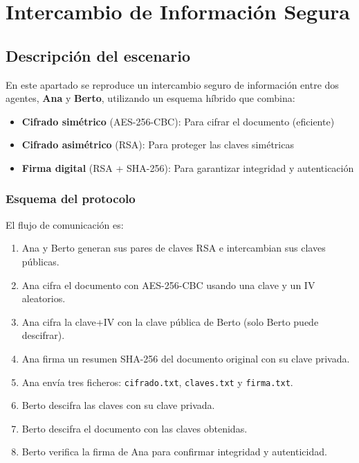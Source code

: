 \chapter{Intercambio de Información Segura}


\section{Descripción del escenario}

En este apartado se reproduce un intercambio seguro de información entre dos agentes, \textbf{Ana} y \textbf{Berto}, utilizando un esquema híbrido que combina:

\begin{itemize}[label=\textbullet]
    \item \textbf{Cifrado simétrico} (AES-256-CBC): Para cifrar el documento (eficiente)
    \item \textbf{Cifrado asimétrico} (RSA): Para proteger las claves simétricas
    \item \textbf{Firma digital} (RSA + SHA-256): Para garantizar integridad y autenticación
\end{itemize}

\subsection{Esquema del protocolo}

El flujo de comunicación es:

\begin{enumerate}
    \item Ana y Berto generan sus pares de claves RSA e intercambian sus claves públicas.
    \item Ana cifra el documento con AES-256-CBC usando una clave y un IV aleatorios.
    \item Ana cifra la clave+IV con la clave pública de Berto (solo Berto puede descifrar).
    \item Ana firma un resumen SHA-256 del documento original con su clave privada.
    \item Ana envía tres ficheros: \texttt{cifrado.txt}, \texttt{claves.txt} y \texttt{firma.txt}.
    \item Berto descifra las claves con su clave privada.
    \item Berto descifra el documento con las claves obtenidas.
    \item Berto verifica la firma de Ana para confirmar integridad y autenticidad.
\end{enumerate}

